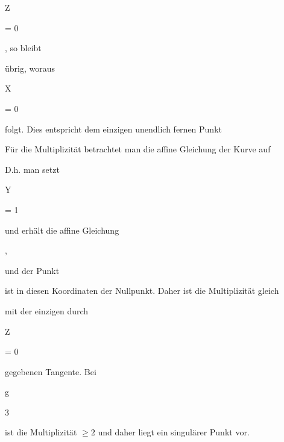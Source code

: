 {{{Z
}

{ = }{ 0
}

{  }{
}

{    }{
}

{   }{
}

}
{}{}{,}
so bleibt

 übrig, woraus


\mavergleichskette

{\vergleichskette

{X
}

{ = }{ 0
}

{  }{
}

{    }{
}

{   }{
}

}
{}{}{}
folgt. Dies entspricht dem einzigen unendlich fernen Punkt



Für die Multiplizität betrachtet man die affine Gleichung der Kurve auf

 D.h. man setzt


\mavergleichskette

{\vergleichskette

{ Y
}

{ = }{ 1
}

{  }{
}

{    }{
}

{   }{
}

}
{}{}{}
und erhält die affine Gleichung


 { , }


und der Punkt

 ist in diesen Koordinaten der Nullpunkt. Daher ist die Multiplizität gleich

 mit der einzigen durch


\mavergleichskette

{\vergleichskette

{ Z
}

{ = }{ 0
}

{  }{
}

{    }{
}

{   }{
}

}
{}{}{}
gegebenen Tangente. Bei


\mavergleichskette

{\vergleichskette

{ g
}

{ \geq }{ 3
}

{  }{
}

{    }{
}

{   }{
}

}
{}{}{}
ist die Multiplizität $\geq 2$ und daher liegt ein singulärer Punkt vor.


}


